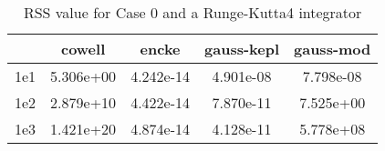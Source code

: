 \begin{table}
\centering
\begin{tabular}{|c|c|c|c|c|}
\hline
 & cowell & encke & gauss-kepl & gauss-mod \\
\hline
1e1 & 5.306e+00 & 4.242e-14 & 4.901e-08 & 7.798e-08 \\
\hline
1e2 & 2.879e+10 & 4.422e-14 & 7.870e-11 & 7.525e+00 \\
\hline
1e3 & 1.421e+20 & 4.874e-14 & 4.128e-11 & 5.778e+08 \\
\hline
\end{tabular}
\caption{RSS value for Case 0 and a Runge-Kutta4 integrator}
\label{table:tab:keplerapprox_rss_C0_Runge-Kutta4}
\end{table}
